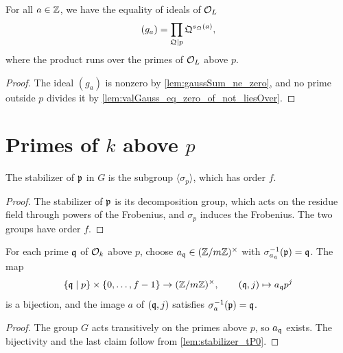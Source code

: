 \begin{lemma}
  \label{lem:gaussSum_factorization_L}
  \leanok
  For all $a \in \mathbb{Z}$, we have the equality of ideals of $\mathcal{O}_L$
  \[
    (g_a) = \prod_{\mathfrak{Q} \mid p} \mathfrak{Q}^{s_{\mathfrak{Q}}(a)},
  \]
  where the product runs over the primes of $\mathcal{O}_L$ above $p$.
\end{lemma}

\begin{proof}
  \leanok
  The ideal $(g_a)$ is nonzero by \ref{lem:gaussSum_ne_zero}, and no prime outside $p$ divides
  it by \ref{lem:valGauss_eq_zero_of_not_liesOver}.
\end{proof}

\section{Primes of $k$ above $p$}

\begin{lemma}
  \label{lem:stabilizer_tP0}
  \leanok
  The stabilizer of $\mathfrak{p}$ in $G$ is the subgroup $\langle \sigma_p \rangle$, which has
  order $f$.
\end{lemma}

\begin{proof}
  \leanok
  The stabilizer of $\mathfrak{p}$ is its decomposition group, which acts on the residue field through
  powers of the Frobenius, and $\sigma_p$ induces the Frobenius. The two groups have order $f$.
\end{proof}

\begin{definition}
  \label{def:equivUnits}
  \leanok
  For each prime $\mathfrak{q}$ of $\mathcal{O}_k$ above $p$, choose $a_{\mathfrak{q}} \in (\mathbb{Z}/m\mathbb{Z})^\times$ with
  $\sigma_{a_{\mathfrak{q}}}^{-1}(\mathfrak{p}) = \mathfrak{q}$. The map
  \[
    \{\mathfrak{q} \mid p\} \times \{0, \ldots, f-1\} \to (\mathbb{Z}/m\mathbb{Z})^\times, \qquad
    (\mathfrak{q}, j) \mapsto a_{\mathfrak{q}} p^j
  \]
  is a bijection, and the image $a$ of $(\mathfrak{q}, j)$ satisfies $\sigma_a^{-1}(\mathfrak{p}) = \mathfrak{q}$.
\end{definition}

\begin{proof}
  \leanok
  The group $G$ acts transitively on the primes above $p$, so $a_{\mathfrak{q}}$ exists. The bijectivity
  and the last claim follow from \ref{lem:stabilizer_tP0}.
\end{proof}

